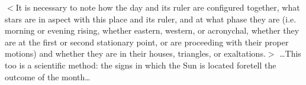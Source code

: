 \mndl $<$It is necessary to note how the day and its ruler are configured together, what stars are in aspect with this place and its ruler, and at what phase they are (i.e. morning or evening rising, whether eastern,
western, or acronychal, whether they are at the first or second stationary point, or are proceeding with their proper motions) and whether they are in their houses, triangles, or exaltations.$>$
…This too is a scientific method: the signs in which the Sun is located foretell the outcome of the month…


\newpage